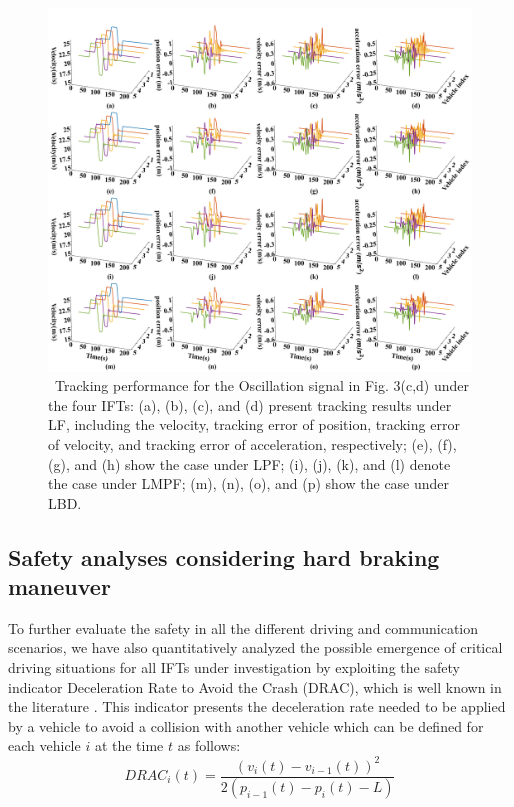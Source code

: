 \documentclass[a4paper]{cas-sc}
\begin{document}
\begin{figure}
  \centering
  \includegraphics[width=14cm]{figs/fig5.png}
  \caption{~Tracking performance for the Oscillation signal in Fig. 3(c,d) under the four IFTs: (a), (b), (c), and (d) present tracking results under LF, including the velocity, tracking error of position, tracking error of velocity, and tracking error of acceleration, respectively; (e), (f), (g), and (h) show the case under LPF; (i), (j), (k), and (l) denote the case under LMPF; (m), (n), (o), and (p) show the case under LBD.}
  \label{fig5}
\end{figure}


\subsection{Safety analyses considering hard braking maneuver}

To further evaluate the safety in all the different driving and communication scenarios, we have also quantitatively analyzed the possible emergence of critical driving situations for all IFTs under investigation by exploiting the safety indicator Deceleration Rate to Avoid the Crash (DRAC), which is well known in the literature \citep{saccomanno2008comparing,fu2021comparison}. This indicator presents the deceleration rate needed to be applied by a vehicle to avoid a collision with another vehicle which can be defined for each vehicle $i$ at the time $t$ as follows:
\begin{equation}
  DRA{C_i}(t) = \frac{{{{\left( {{v_i}(t) - {v_{i - 1}}(t)} \right)}^2}}}{{2\left( {{p_{i - 1}}(t) - {p_i}(t) - L} \right)}}
  \label{eqsafe}
\end{equation}
\end{document}
